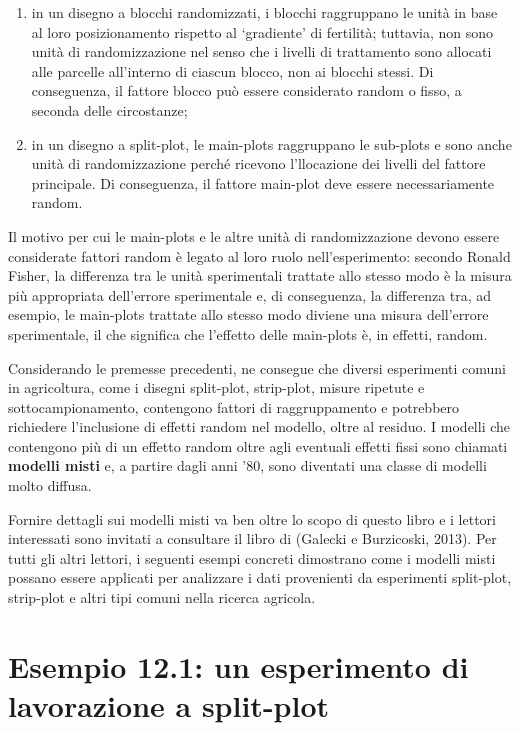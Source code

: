\documentclass[
  12pt,
]{book}
\providecommand{\tightlist}{%
  \setlength{\itemsep}{0pt}\setlength{\parskip}{0pt}}
\begin{document}
\begin{enumerate}
\def\labelenumi{\arabic{enumi}.}
\tightlist
\item
  in un disegno a blocchi randomizzati, i blocchi raggruppano le unità in base al loro posizionamento rispetto al `gradiente' di fertilità; tuttavia, non sono unità di randomizzazione nel senso che i livelli di trattamento sono allocati alle parcelle all'interno di ciascun blocco, non ai blocchi stessi. Di conseguenza, il fattore blocco può essere considerato random o fisso, a seconda delle circostanze;
\item
  in un disegno a split-plot, le main-plots raggruppano le sub-plots e sono anche unità di randomizzazione perché ricevono l'llocazione dei livelli del fattore principale. Di conseguenza, il fattore main-plot deve essere necessariamente random.
\end{enumerate}

Il motivo per cui le main-plots e le altre unità di randomizzazione devono essere considerate fattori random è legato al loro ruolo nell'esperimento: secondo Ronald Fisher, la differenza tra le unità sperimentali trattate allo stesso modo è la misura più appropriata dell'errore sperimentale e, di conseguenza, la differenza tra, ad esempio, le main-plots trattate allo stesso modo diviene una misura dell'errore sperimentale, il che significa che l'effetto delle main-plots è, in effetti, random.

Considerando le premesse precedenti, ne consegue che diversi esperimenti comuni in agricoltura, come i disegni split-plot, strip-plot, misure ripetute e sottocampionamento, contengono fattori di raggruppamento e potrebbero richiedere l'inclusione di effetti random nel modello, oltre al residuo. I modelli che contengono più di un effetto random oltre agli eventuali effetti fissi sono chiamati \textbf{modelli misti} e, a partire dagli anni '80, sono diventati una classe di modelli molto diffusa.

Fornire dettagli sui modelli misti va ben oltre lo scopo di questo libro e i lettori interessati sono invitati a consultare il libro di (Galecki e Burzicoski, 2013). Per tutti gli altri lettori, i seguenti esempi concreti dimostrano come i modelli misti possano essere applicati per analizzare i dati provenienti da esperimenti split-plot, strip-plot e altri tipi comuni nella ricerca agricola.

\hypertarget{esempio-12.1-un-esperimento-di-lavorazione-a-split-plot}{%
\section{Esempio 12.1: un esperimento di lavorazione a split-plot}\label{esempio-12.1-un-esperimento-di-lavorazione-a-split-plot}}
\end{document}
